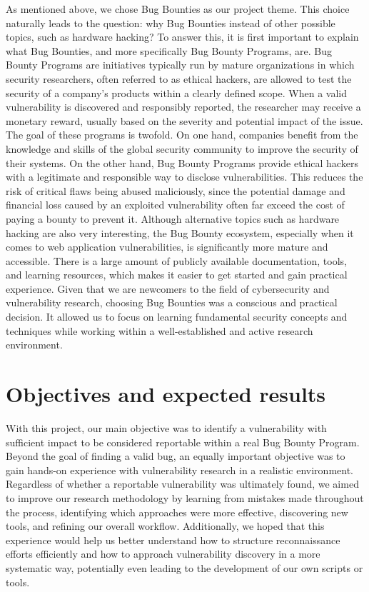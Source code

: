 \documentclass[12pt,a4paper]{report}
\begin{document}
As mentioned above, we chose Bug Bounties as our project theme. This choice naturally leads to the question: why Bug Bounties instead of other possible topics, such as hardware hacking?
To answer this, it is first important to explain what Bug Bounties, and more specifically Bug Bounty Programs, are. Bug Bounty Programs are initiatives typically run by mature organizations in which security researchers, often referred to as ethical hackers, are allowed to test the security of a company’s products within a clearly defined scope. When a valid vulnerability is discovered and responsibly reported, the researcher may receive a monetary reward, usually based on the severity and potential impact of the issue.
The goal of these programs is twofold. On one hand, companies benefit from the knowledge and skills of the global security community to improve the security of their systems. On the other hand, Bug Bounty Programs provide ethical hackers with a legitimate and responsible way to disclose vulnerabilities. This reduces the risk of critical flaws being abused maliciously, since the potential damage and financial loss caused by an exploited vulnerability often far exceed the cost of paying a bounty to prevent it.
Although alternative topics such as hardware hacking are also very interesting, the Bug Bounty ecosystem, especially when it comes to web application vulnerabilities, is significantly more mature and accessible. There is a large amount of publicly available documentation, tools, and learning resources, which makes it easier to get started and gain practical experience.
Given that we are newcomers to the field of cybersecurity and vulnerability research, choosing Bug Bounties was a conscious and practical decision. It allowed us to focus on learning fundamental security concepts and techniques while working within a well-established and active research environment.


\section{Objectives and expected results}

With this project, our main objective was to identify a vulnerability with sufficient impact to be considered reportable within a real Bug Bounty Program. Beyond the goal of finding a valid bug, an equally important objective was to gain hands-on experience with vulnerability research in a realistic environment.
Regardless of whether a reportable vulnerability was ultimately found, we aimed to improve our research methodology by learning from mistakes made throughout the process, identifying which approaches were more effective, discovering new tools, and refining our overall workflow. Additionally, we hoped that this experience would help us better understand how to structure reconnaissance efforts efficiently and how to approach vulnerability discovery in a more systematic way, potentially even leading to the development of our own scripts or tools.
\end{document}
